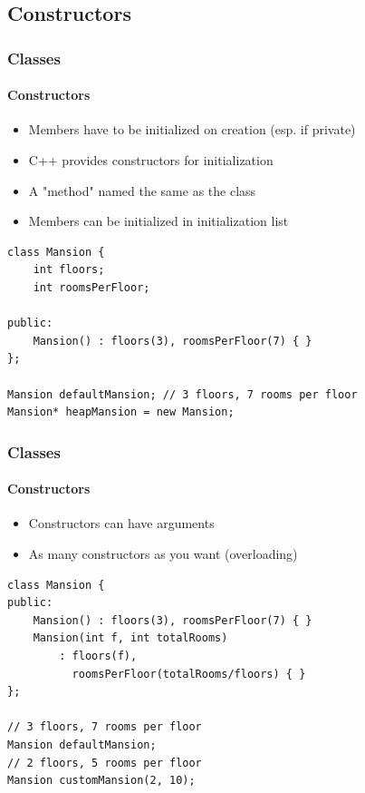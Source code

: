\documentclass[table]{beamer}
\newcommand{\declarelesson}{\textbf{\color{themegreen}{Lesson:}} }
\begin{document}


\subsection{Constructors}
\frame{\subsectionpage}

\begin{frame}[fragile]
    \frametitle{\declarelesson Classes }
    \framesubtitle{Constructors}
    \begin{itemize}
        \item Members have to be initialized on creation (esp. if private)
        \item C++ provides constructors for initialization
        \item A "method" named the same as the class
        \item Members can be initialized in initialization list
    \end{itemize}
    \begin{lstlisting}[title=Default Constructor]
class Mansion {
    int floors;
    int roomsPerFloor;

public:
    Mansion() : floors(3), roomsPerFloor(7) { }
};

Mansion defaultMansion; // 3 floors, 7 rooms per floor
Mansion* heapMansion = new Mansion;
    \end{lstlisting}
\end{frame}

\begin{frame}[fragile]
    \frametitle{\declarelesson Classes }
    \framesubtitle{Constructors}
    \begin{itemize}
        \item Constructors can have arguments
        \item As many constructors as you want (overloading)
    \end{itemize}
    \begin{lstlisting}[title=Constructor with arguments]
class Mansion {
public:
    Mansion() : floors(3), roomsPerFloor(7) { }
    Mansion(int f, int totalRooms)
        : floors(f),
          roomsPerFloor(totalRooms/floors) { }
};

// 3 floors, 7 rooms per floor
Mansion defaultMansion; 
// 2 floors, 5 rooms per floor
Mansion customMansion(2, 10); 
    \end{lstlisting}
\end{frame}
\end{document}
